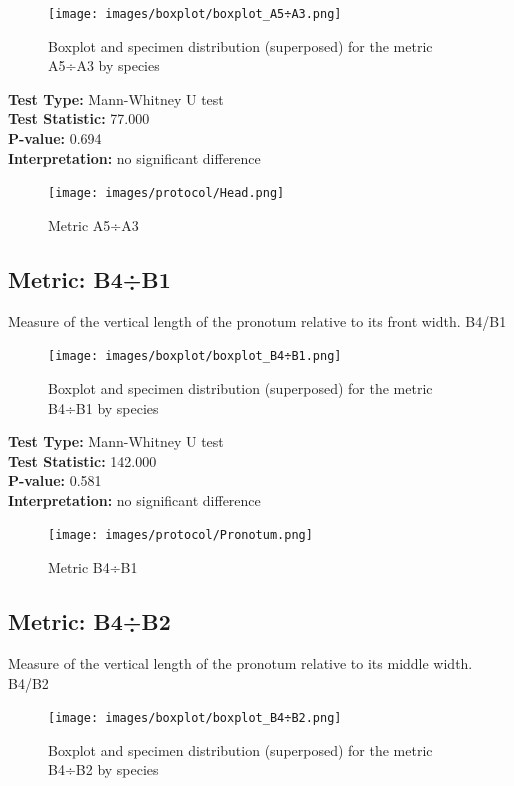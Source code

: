\begin{figure}[H]
\centering
\texttt{[image: images/boxplot/boxplot\_A5÷A3.png]}
\caption{  Boxplot and specimen distribution (superposed) for the metric  A5÷A3 by species}
\end{figure}

\noindent\textbf{Test Type:} Mann-Whitney U test \\
\noindent\textbf{Test Statistic:} 77.000 \\
\noindent\textbf{P-value:} 0.694 \\
\noindent\textbf{Interpretation:} no significant difference

\begin{figure}[H]
\centering
\texttt{[image: images/protocol/Head.png]}
\caption{ Metric A5÷A3}
\end{figure}

\newpage
\subsection*{Metric: B4÷B1}

Measure of the vertical length of the pronotum relative to its front width. B4/B1

\begin{figure}[H]
\centering
\texttt{[image: images/boxplot/boxplot\_B4÷B1.png]}
\caption{  Boxplot and specimen distribution (superposed) for the metric  B4÷B1 by species}
\end{figure}

\noindent\textbf{Test Type:} Mann-Whitney U test \\
\noindent\textbf{Test Statistic:} 142.000 \\
\noindent\textbf{P-value:} 0.581 \\
\noindent\textbf{Interpretation:} no significant difference

\begin{figure}[H]
\centering
\texttt{[image: images/protocol/Pronotum.png]}
\caption{ Metric B4÷B1}
\end{figure}

\newpage
\subsection*{Metric: B4÷B2}

Measure of the vertical length of the pronotum relative to its middle width. B4/B2

\begin{figure}[H]
\centering
\texttt{[image: images/boxplot/boxplot\_B4÷B2.png]}
\caption{  Boxplot and specimen distribution (superposed) for the metric  B4÷B2 by species}
\end{figure}

